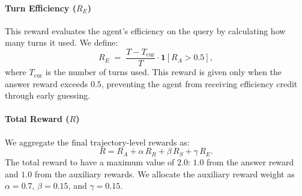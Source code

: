 \documentclass[11pt]{article}
\newcommand{\ml}[1]{\textcolor{orange}{\bf [lan: #1]}}
\newcommand{\jk}[1]{\textcolor{olive}{\bf [sf: #1]}}
\newcommand{\vn}[1]{\textcolor{blue}{\bf [varun: #1]}}
\begin{document}
\paragraph{Turn Efficiency ($R_E$)} This reward evaluates the agent's efficiency on the query by calculating how many turns it used. We define:
\[
R_E \;=\; \frac{T-T_{\text{cur}}}{T} \cdot \mathbf{1}[R_A > 0.5],
\]
where $T_{\text{cur}}$ is the number of turns used. This reward is given only when the answer reward exceeds $0.5$, preventing the agent from receiving efficiency credit through early guessing.

\paragraph{Total Reward ($R$)} We aggregate the final trajectory-level rewards as:
\[
R = R_A + \alpha \, R_R + \beta \, R_S + \gamma \, R_E.
\]
The total reward to have a maximum value of \(2.0\): \(1.0\) from the answer reward and \(1.0\) from the auxiliary rewards. We allocate the auxiliary reward weight as \(\alpha=0.7\), \(\beta=0.15\), and \(\gamma=0.15\). 



\end{document}
